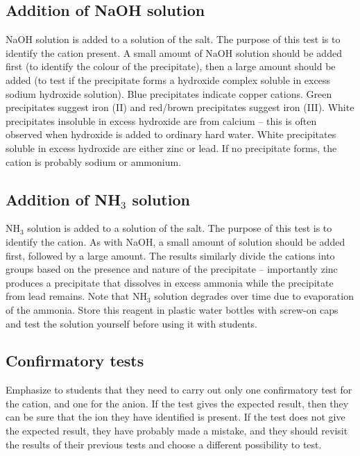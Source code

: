 \subsection{Addition of NaOH solution}
NaOH solution is added to a solution of the salt. 
The purpose of this test is to identify the cation present. 
A small amount of NaOH solution should be added first 
(to identify the colour of the precipitate), 
then a large amount should be added (to test if the precipitate 
forms a hydroxide complex soluble in excess sodium hydroxide solution). 
Blue precipitates indicate copper cations. 
Green precipitates suggest iron (II) 
and red/brown precipitates suggest iron (III). 
White precipitates insoluble in excess hydroxide are from calcium – 
this is often observed when hydroxide is added to ordinary hard water. 
White precipitates soluble in excess hydroxide are either zinc or lead. 
If no precipitate forms, 
the cation is probably sodium or ammonium.

\subsection{Addition of NH$_{3}$ solution}
NH$_{3}$ solution is added to a solution of the salt. 
The purpose of this test is to identify the cation. 
As with NaOH, 
a small amount of solution should be added first, 
followed by a large amount. 
The results similarly divide the cations into groups 
based on the presence and nature of the precipitate – 
importantly zinc produces a precipitate that dissolves in excess ammonia 
while the precipitate from lead remains. 
Note that NH$_{3}$ solution degrades over time 
due to evaporation of the ammonia. 
Store this reagent in plastic water bottles with screw-on caps 
and test the solution yourself before using it with students.

\subsection{Confirmatory tests}
Emphasize to students that they need to carry out 
only one confirmatory test for the cation, 
and one for the anion. 
If the test gives the expected result, 
then they can be sure that the ion they have identified is present. 
If the test does not give the expected result, 
they have probably made a mistake, 
and they should revisit the results of their previous tests 
and choose a different possibility to test.

